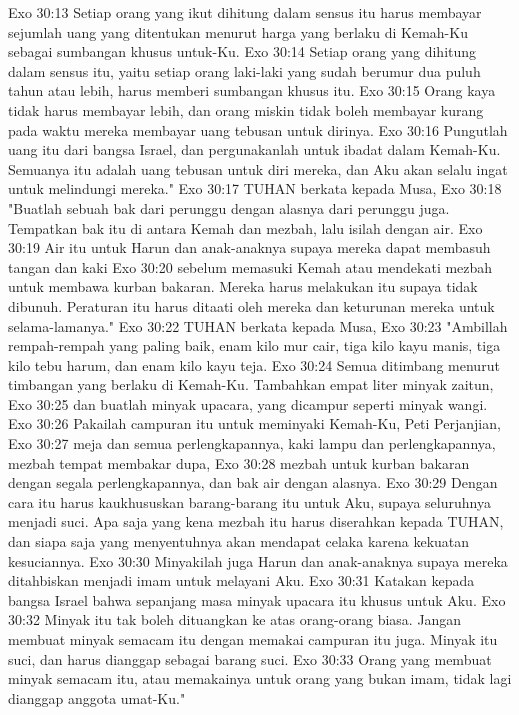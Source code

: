 Exo 30:13  Setiap orang yang ikut dihitung dalam sensus itu harus membayar sejumlah uang yang ditentukan menurut harga yang berlaku di Kemah-Ku sebagai sumbangan khusus untuk-Ku.
Exo 30:14  Setiap orang yang dihitung dalam sensus itu, yaitu setiap orang laki-laki yang sudah berumur dua puluh tahun atau lebih, harus memberi sumbangan khusus itu.
Exo 30:15  Orang kaya tidak harus membayar lebih, dan orang miskin tidak boleh membayar kurang pada waktu mereka membayar uang tebusan untuk dirinya.
Exo 30:16  Pungutlah uang itu dari bangsa Israel, dan pergunakanlah untuk ibadat dalam Kemah-Ku. Semuanya itu adalah uang tebusan untuk diri mereka, dan Aku akan selalu ingat untuk melindungi mereka."
Exo 30:17  TUHAN berkata kepada Musa,
Exo 30:18  "Buatlah sebuah bak dari perunggu dengan alasnya dari perunggu juga. Tempatkan bak itu di antara Kemah dan mezbah, lalu isilah dengan air.
Exo 30:19  Air itu untuk Harun dan anak-anaknya supaya mereka dapat membasuh tangan dan kaki
Exo 30:20  sebelum memasuki Kemah atau mendekati mezbah untuk membawa kurban bakaran. Mereka harus melakukan itu supaya tidak dibunuh. Peraturan itu harus ditaati oleh mereka dan keturunan mereka untuk selama-lamanya."
Exo 30:22  TUHAN berkata kepada Musa,
Exo 30:23  "Ambillah rempah-rempah yang paling baik, enam kilo mur cair, tiga kilo kayu manis, tiga kilo tebu harum, dan enam kilo kayu teja.
Exo 30:24  Semua ditimbang menurut timbangan yang berlaku di Kemah-Ku. Tambahkan empat liter minyak zaitun,
Exo 30:25  dan buatlah minyak upacara, yang dicampur seperti minyak wangi.
Exo 30:26  Pakailah campuran itu untuk meminyaki Kemah-Ku, Peti Perjanjian,
Exo 30:27  meja dan semua perlengkapannya, kaki lampu dan perlengkapannya, mezbah tempat membakar dupa,
Exo 30:28  mezbah untuk kurban bakaran dengan segala perlengkapannya, dan bak air dengan alasnya.
Exo 30:29  Dengan cara itu harus kaukhususkan barang-barang itu untuk Aku, supaya seluruhnya menjadi suci. Apa saja yang kena mezbah itu harus diserahkan kepada TUHAN, dan siapa saja yang menyentuhnya akan mendapat celaka karena kekuatan kesuciannya.
Exo 30:30  Minyakilah juga Harun dan anak-anaknya supaya mereka ditahbiskan menjadi imam untuk melayani Aku.
Exo 30:31  Katakan kepada bangsa Israel bahwa sepanjang masa minyak upacara itu khusus untuk Aku.
Exo 30:32  Minyak itu tak boleh dituangkan ke atas orang-orang biasa. Jangan membuat minyak semacam itu dengan memakai campuran itu juga. Minyak itu suci, dan harus dianggap sebagai barang suci.
Exo 30:33  Orang yang membuat minyak semacam itu, atau memakainya untuk orang yang bukan imam, tidak lagi dianggap anggota umat-Ku."
